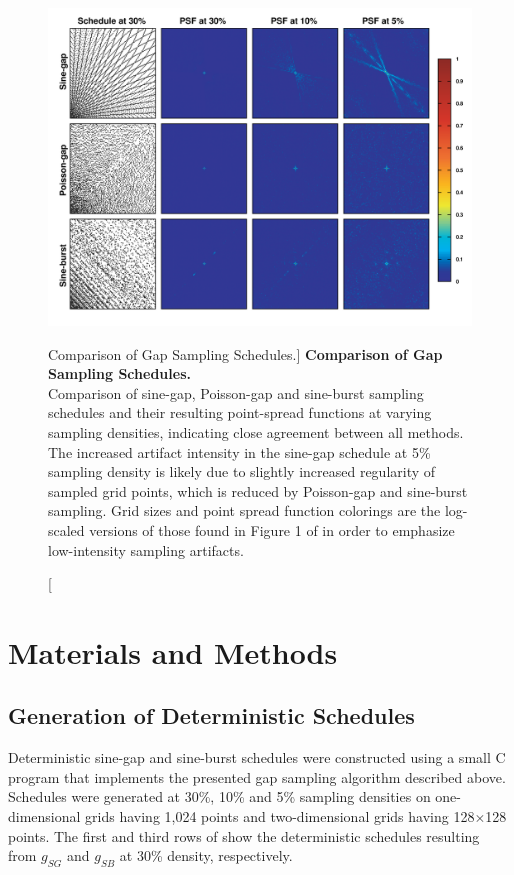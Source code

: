 \begin{figure}[ht!]
\includegraphics[width=6.5in]{figs/dgs/05-psf.png}
\caption
      [Comparison of Gap Sampling Schedules.]{
  {\bf Comparison of Gap Sampling Schedules.}
  \\
  Comparison of sine-gap, Poisson-gap and sine-burst sampling schedules and
  their resulting point-spread functions at varying sampling densities,
  indicating close agreement between all methods. The increased artifact
  intensity in the sine-gap schedule at 5\% sampling density is likely due
  to slightly increased regularity of sampled grid points, which is reduced
  by Poisson-gap and sine-burst sampling. Grid sizes and point spread function
  colorings are the log-scaled versions of those found in Figure 1 of
  \cite{hoch:acr2014} in order to emphasize low-intensity sampling artifacts.
}
\label{figure.2.5}
\end{figure}

\section{Materials and Methods}

\subsection{Generation of Deterministic Schedules}

\begin{doublespace}
Deterministic sine-gap and sine-burst schedules were constructed using a small
C program that implements the presented gap sampling algorithm described above.
Schedules were generated at 30\%, 10\% and 5\% sampling densities on
one-dimensional grids having 1,024 points and two-dimensional grids having
128$\times$128 points. The first and third rows of 
show the deterministic schedules resulting from $g_{SG}$ and $g_{SB}$
at 30\% density, respectively.
\end{doublespace}

